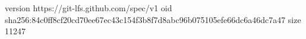 version https://git-lfs.github.com/spec/v1
oid sha256:84c0ff8cf20cd70ee67ec43c154f3b8f7d8abc96b075105efe66dc6a46dc7a47
size 11247
